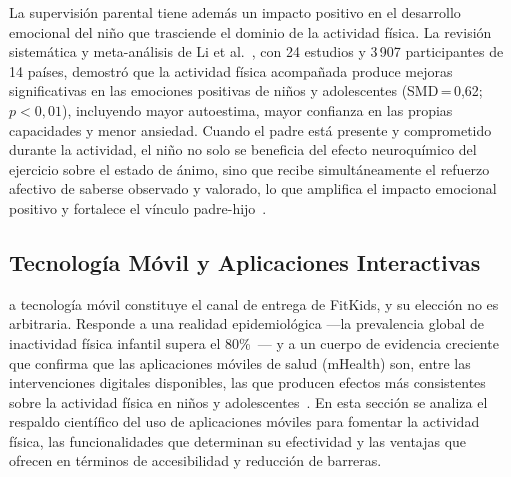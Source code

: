 					La supervisión parental tiene además un impacto positivo en el desarrollo emocional del niño que trasciende el dominio de la actividad física. La revisión sistemática y meta-análisis de Li et al.~\cite{Li2022}, con 24 estudios y 3\,907 participantes de 14 países, demostró que la actividad física acompañada produce mejoras significativas en las emociones positivas de niños y adolescentes (SMD\,=\,0,62; $p < 0{,}01$), incluyendo mayor autoestima, mayor confianza en las propias capacidades y menor ansiedad. Cuando el padre está presente y comprometido durante la actividad, el niño no solo se beneficia del efecto neuroquímico del ejercicio sobre el estado de ánimo, sino que recibe simultáneamente el refuerzo afectivo de saberse observado y valorado, lo que amplifica el impacto emocional positivo y fortalece el vínculo padre-hijo~\cite{Li2022,VegaDiaz2023}.

			\subsection{Tecnología Móvil y Aplicaciones Interactivas}
				a tecnología móvil constituye el canal de entrega de FitKids, y su elección no es arbitraria. Responde a una realidad epidemiológica ---la prevalencia global de inactividad física infantil supera el 80\%~\cite{Guthold2020}--- y a un cuerpo de evidencia creciente que confirma que las aplicaciones móviles de salud (mHealth) son, entre las intervenciones digitales disponibles, las que producen efectos más consistentes sobre la actividad física en niños y adolescentes~\cite{He2021,Baumann2022}. En esta sección se analiza el respaldo científico del uso de aplicaciones móviles para fomentar la actividad física, las funcionalidades que determinan su efectividad y las ventajas que ofrecen en términos de accesibilidad y reducción de barreras.
				
